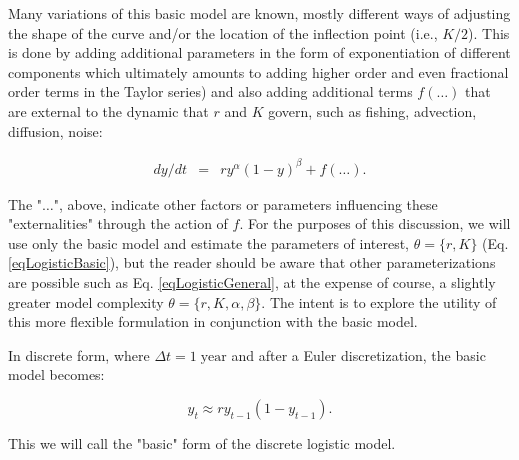 \documentclass[letterpaper,portrait,11pt]{scrartcl}
\numberwithin{equation}{section}    %
\numberwithin{figure}{section}    %
\numberwithin{table}{section}       %
\begin{document}
\begin{appendices}
Many variations of this basic model are known, mostly different ways of adjusting the shape of the curve and/or the location of the inflection point (i.e., $K/2$). This is done by adding additional parameters in the form of exponentiation of different components which ultimately amounts to adding higher order and even fractional order terms in the Taylor series) and also adding additional terms $f(\dots)$ that are external to the dynamic that $r$ and $K$ govern, such as fishing, advection, diffusion, noise:

\begin{eqnarray}
\label{eqLogisticGeneral}
dy / dt &=& r y^{\alpha} ( 1 - y )^{\beta} + f(\dots).
\end{eqnarray}

The "$\dots$", above, indicate other factors or parameters influencing these "externalities" through the action of $f$. For the purposes of this discussion, we will use only the basic model and estimate the parameters of interest, $\theta = \{r, K \}$ (Eq. \ref{eqLogisticBasic}), but the reader should be aware that other parameterizations are possible such as Eq. \ref{eqLogisticGeneral}, at the expense of course, a slightly greater model complexity $\theta=\{r,K,\alpha,\beta\}$. The intent is to explore the utility of this more flexible formulation in conjunction with the basic model.

In discrete form, where $\Delta t = 1 \; \text{year}$ and after a Euler discretization, the basic model becomes:

\begin{equation}
\label{eqLogisticDiscrete:appendix}
y_t  \approx r y_{t-1} (1 - y_{t-1} ).
\end{equation}

This we will call the "basic" form of the discrete logistic model.


\end{appendices}
\end{document}

